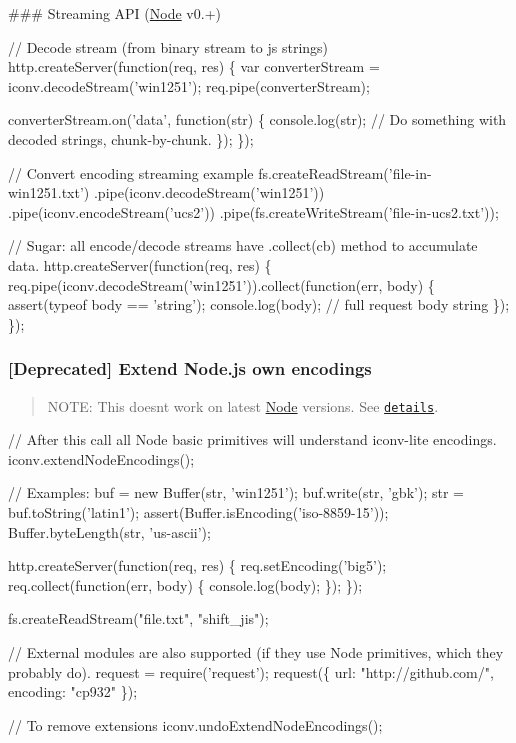 \#\#\# Streaming A\+PI (\mbox{\hyperlink{classNode}{Node}} v0.+) 
\begin{DoxyCode}
// Decode stream (from binary stream to js strings)
http.createServer(function(req, res) \{
    var converterStream = iconv.decodeStream('win1251');
    req.pipe(converterStream);

    converterStream.on('data', function(str) \{
        console.log(str); // Do something with decoded strings, chunk-by-chunk.
    \});
\});

// Convert encoding streaming example
fs.createReadStream('file-in-win1251.txt')
    .pipe(iconv.decodeStream('win1251'))
    .pipe(iconv.encodeStream('ucs2'))
    .pipe(fs.createWriteStream('file-in-ucs2.txt'));

// Sugar: all encode/decode streams have .collect(cb) method to accumulate data.
http.createServer(function(req, res) \{
    req.pipe(iconv.decodeStream('win1251')).collect(function(err, body) \{
        assert(typeof body == 'string');
        console.log(body); // full request body string
    \});
\});
\end{DoxyCode}


\subsubsection*{\mbox{[}Deprecated\mbox{]} Extend Node.\+js own encodings}

\begin{quote}
N\+O\+TE\+: This doesn\textquotesingle{}t work on latest \mbox{\hyperlink{classNode}{Node}} versions. See \href{https://github.com/ashtuchkin/iconv-lite/wiki/Node-v4-compatibility}{\tt details}. \end{quote}



\begin{DoxyCode}
// After this call all Node basic primitives will understand iconv-lite encodings.
iconv.extendNodeEncodings();

// Examples:
buf = new Buffer(str, 'win1251');
buf.write(str, 'gbk');
str = buf.toString('latin1');
assert(Buffer.isEncoding('iso-8859-15'));
Buffer.byteLength(str, 'us-ascii');

http.createServer(function(req, res) \{
    req.setEncoding('big5');
    req.collect(function(err, body) \{
        console.log(body);
    \});
\});

fs.createReadStream("file.txt", "shift\_jis");

// External modules are also supported (if they use Node primitives, which they probably do).
request = require('request');
request(\{
    url: "http://github.com/", 
    encoding: "cp932"
\});

// To remove extensions
iconv.undoExtendNodeEncodings();
\end{DoxyCode}


